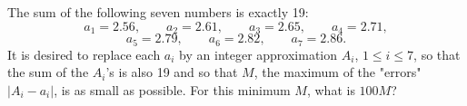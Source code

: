 The sum of the following seven numbers is exactly 19:
\[a_1=2.56,\qquad a_2=2.61,\qquad a_3=2.65,\qquad a_4=2.71,\]\[a_5=2.79,\qquad a_6=2.82,\qquad a_7=2.86.\]It is desired to replace each $a_i$ by an integer approximation $A_i$, $1 \le i \le 7$, so that the sum of the $A_i$'s is also 19 and so that $M$, the maximum of the "errors" $|A_i - a_i|$, is as small as possible.  For this minimum $M$, what is $100M$?